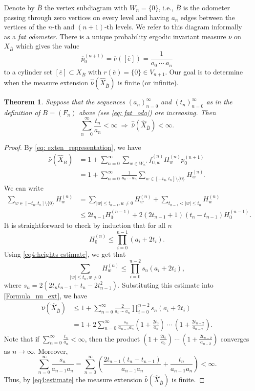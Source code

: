 \documentclass[11pt,reqno]{amsart}
\theoremstyle{definition}
\theoremstyle{remark}
\theoremstyle{plain}
\newtheorem{theorem}[definition]{Theorem}
\def\ol{\overline}
\def\ov{\overline}
\def\wh{\widehat}
\newcommand{\be}{\begin{equation}}
\newcommand{\ee}{\end{equation}}
\newcommand{\ba}{\begin{aligned}}
\newcommand{\ea}{\end{aligned}}
\numberwithin{equation}{section}
\begin{document}
Denote by $\ov B$ the vertex subdiagram with $W_n = \{0\}$, i.e., 
$\ol B$ is the odometer passing through zero vertices on every level
and having $a_n$ edges between the vertices of the $n$-th and $(n+1)$-th levels. We refer to this diagram informally as a \textit{fat odometer}. There is a unique probability ergodic invariant measure $\ol\nu$ on $X_{\ov B}$ which gives the value
$$
\ov p_0^{(n+1)} = \ol\nu([\ov e]) = \frac{1}{a_0\ \cdots\ a_n}
$$
to a cylinder set $[\ov e] \subset X_{\ov B}$ with $r(\ov e) = \{0\} \in V_{n+1}$.
Our goal is to determine when the 
measure extension $\wh {\ol\nu}(\wh X_{\ov B})$ is finite (or infinite). 

\begin{theorem}\label{thm: ext fat odom}
Suppose that the sequences $(a_n)_{n=0}^{\infty}$ and $(t_n)_{n=0}^{\infty}$ as in the definition of $B=(F_n)$ above (see \eqref{eq: fat_odo}) are increasing.
Then 
\be\label{eq3 finite ext}
\sum_{n = 0}^{\infty} \frac{t_n}{a_n} < \infty \ \Longrightarrow \ 
\wh {\ol\nu}(\wh X_{\ov B}) < \infty.
\ee 
\end{theorem}

\begin{proof} By \eqref{eq: exten_representation}, we have 
\be\label{Formula_nu_ext}
\ba 
\wh \nu(\wh X_{\ov B}) &= 1 + \sum_{n = 0}^{\infty} \sum_{w \in W_n'}f_{0,w}^{(n)} H_w^{(n)}\ov p_0^{(n+1)}\\
&= 1 + \sum_{n = 0}^{\infty} \frac{1}{a_0\ \cdots\ a_n} \sum_{w \in [-t_n,t_n] \setminus \{0\}} H_w^{(n)}.
\ea
\ee
We can write 
$$
\ba 
\sum_{w \in [-t_n,t_n] \setminus \{0\}} H_w^{(n)} & = 
\sum_{|w| \leq t_{n-1}, w\neq 0} H_w^{(n)}  + 
\sum_{t_{n-1} < |w| \leq t_{n}} H_w^{(n)}  \\
& \leq 2 t_{n-1} H_0^{(n-1)} + 2 (2t_{n-1} +1) (t_n - t_{n-1}) 
H_0^{(n-1)}.
\ea 
$$ 
It is straightforward to check by induction that for all $n$
\be\label{eq4:heights estimate}
H_0^{(n)} \leq \prod_{i=0}^{n-1} (a_i + 2 t_i).
\ee
Using \eqref{eq4:heights estimate}, we get that
$$
\sum_{|w| \leq t_n, w \neq 0} H_w^{(n)} \leq 
\prod_{i=0}^{n-2} s_n (a_i + 2 t_i), 
$$
where $s_n = 2(2 t_nt_{n-1} + t_n - 2t^2_{n-1})$. Substituting this estimate into \eqref{Formula_nu_ext}, we have 
\be\label{eq4:estimate}
\ba 
\wh \nu(\wh X_{\ov B}) & \leq 1 +  \sum_{n = 0}^{\infty} \frac{2}{a_0\ \cdots\ a_n} 
\prod_{i=0}^{n-2} s_n (a_i + 2 t_i) \\
& = 1 + 2 \sum_{n=0}^\infty \frac{s_n}{a_{n-1} a_n}\left( 1 + 
\frac{2t_0}{a_0}\right) \ \cdots \ \left( 1 + \frac{2t_{n-2}}{a_{n-2}}\right).
\ea
\ee
Note that if $\sum_{n = 0}^{\infty} \frac{t_n}{a_n} < \infty$, then the product $\left( 1 + \frac{2t_0}{a_0}\right) \ \cdots \ \left( 1 + \frac{2t_{n-2}}{a_{n-2}}\right)$ converges as $n \to \infty$. Moreover, 
$$
\sum_{n=0}^\infty \frac{s_n}{a_{n-1} a_n} = \sum_{n=0}^\infty  
\left( \frac{2t_{n-1}(t_n - t_{n-1})}{a_{n-1}a_n} 
+  \frac{t_{n}}{a_{n-1}a_{n}} \right) < \infty.
$$
Thus, by \eqref{eq4:estimate} the measure extension $\wh {\ol\nu}(\wh X_{\ov B})$ is finite.
\end{proof}
\end{document}
